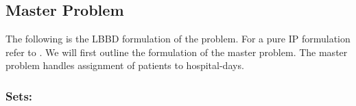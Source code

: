 \subsection*{Master Problem} 

The following is the LBBD formulation of the problem.
For a pure IP formulation refer to \cite{roshanaei2017propagating}. We will first outline
the formulation of the master problem. The master problem handles assignment of patients
to hospital-days.

\subsubsection*{Sets:}
\leavevmode
\newline
\begin{table}[H]
\end{table}

